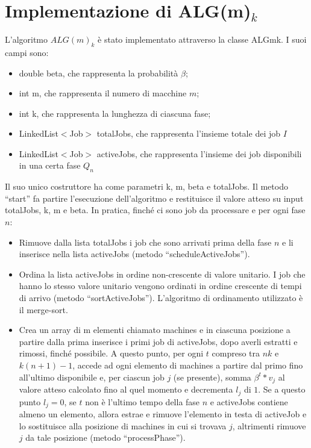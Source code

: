 \documentclass[twoside,openany,titlepage,fleqn,
	headinclude,12pt,a4paper,BCOR5mm,footinclude]{scrbook}
\begin{document}
\section{Implementazione di ALG(m)$_{k}$}
L’algoritmo $ALG(m)_{k}$ è stato implementato attraverso la classe ALGmk. I suoi campi sono:
\begin{itemize}
\item{double beta, che rappresenta la probabilità $\beta$;}
\item{int m, che rappresenta il numero di macchine $m$;}
\item{int k, che rappresenta la lunghezza di ciascuna fase;}
\item{LinkedList$<$Job$>$ totalJobs, che rappresenta l’insieme totale dei job $I$}
\item{LinkedList$<$Job$>$ activeJobs, che rappresenta l’insieme dei job disponibili in una certa fase $Q_{n}$}
\end{itemize}
Il suo unico costruttore ha come parametri k, m, beta e totalJobs. Il metodo “start” fa partire l’esecuzione dell’algoritmo e restituisce il valore atteso su input totalJobs, k, m e beta. In pratica, finché ci sono job da processare e per ogni fase $n$:
\begin{itemize}
\item{Rimuove dalla lista totalJobs i job che sono arrivati prima della fase $n$ e li inserisce nella lista activeJobs (metodo “scheduleActiveJobs”).}
\item{Ordina la lista activeJobs in ordine non-crescente di valore unitario. I job che hanno lo stesso valore unitario  vengono ordinati in ordine crescente di tempi di arrivo (metodo “sortActiveJobs”). L’algoritmo di ordinamento utilizzato è il merge-sort.}
\item{Crea un array di m elementi chiamato machines e in ciascuna posizione a partire dalla prima inserisce i primi job di activeJobs, dopo averli estratti e rimossi, finché possibile. A questo punto, per ogni $t$ compreso tra $nk$ e $k(n + 1) - 1$, accede ad ogni elemento di machines a partire dal primo fino all’ultimo disponibile e, per ciascun job $j$ (se presente), somma $\beta^{t} * v_{j}$ al valore atteso calcolato fino al quel momento e decrementa $l_{j}$ di $1$. Se a questo punto $l_{j} = 0$, se $t$ non è l’ultimo tempo della fase $n$ e activeJobs contiene almeno un elemento, allora estrae e rimuove l’elemento in testa di activeJob e lo sostituisce alla posizione di machines in cui si trovava $j$, altrimenti rimuove $j$ da tale posizione (metodo “processPhase”).}
\end{itemize}
\end{document}
